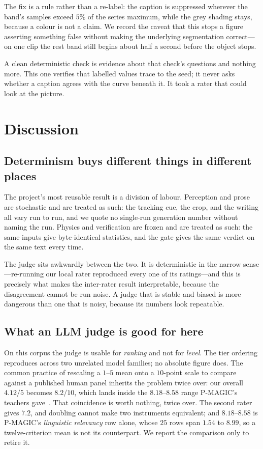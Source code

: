 \documentclass[conference]{IEEEtran}
\begin{document}
The fix is a rule rather than a re-label: the caption is suppressed wherever
the band's samples exceed $5\%$ of the series maximum, while the grey shading
stays, because a colour is not a claim. We record the caveat that this stops a
figure asserting something false without making the underlying segmentation
correct---on one clip the rest band still begins about half a second before the
object stops.

A clean deterministic check is evidence about that check's questions and
nothing more. This one verifies that labelled values trace to the seed; it
never asks whether a caption agrees with the curve beneath it. It took a rater
that could look at the picture.

\section{Discussion}

\subsection{Determinism buys different things in different places}

The project's most reusable result is a division of labour. Perception and
prose are stochastic and are treated as such: the tracking cue, the crop, and
the writing all vary run to run, and we quote no single-run generation number
without naming the run. Physics and verification are frozen and are treated as
such: the same inputs give byte-identical statistics, and the gate gives the
same verdict on the same text every time.

The judge sits awkwardly between the two. It is deterministic in the narrow
sense---re-running our local rater reproduced every one of its ratings---and this
is precisely what makes the inter-rater result interpretable, because the
disagreement cannot be run noise. A judge that is stable and biased is more
dangerous than one that is noisy, because its numbers look repeatable.

\subsection{What an LLM judge is good for here}

On this corpus the judge is usable for \emph{ranking} and not for \emph{level}.
The tier ordering reproduces across two unrelated model families; no absolute
figure does. The common practice of rescaling a $1$--$5$ mean onto a $10$-point
scale to compare against a published human panel inherits the problem twice
over: our overall $4.12/5$ becomes $8.2/10$, which lands inside the
$8.18$--$8.58$ range P-MAGIC's teachers gave~\cite{pmagic}. That coincidence is
worth nothing, twice over. The second rater gives $7.2$, and doubling cannot
make two instruments equivalent; and $8.18$--$8.58$ is P-MAGIC's
\emph{linguistic relevancy} row alone, whose $25$ rows span $1.54$ to $8.99$,
so a twelve-criterion mean is not its counterpart. We report the comparison
only to retire it.
\end{document}
